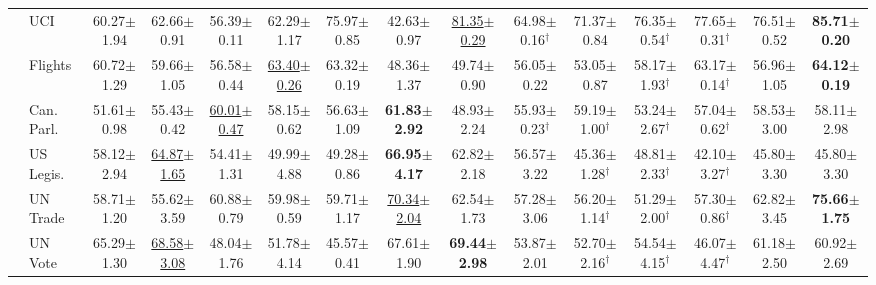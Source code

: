 \begin{table}[t]
{\begin{tabular}{llccccccccccccc}
 & UCI & 60.27{\scriptsize$\pm$1.94} & 62.66{\scriptsize$\pm$0.91} & 56.39{\scriptsize$\pm$0.11} & 62.29{\scriptsize$\pm$1.17} & 75.97{\scriptsize$\pm$0.85} & 42.63{\scriptsize$\pm$0.97} & \underline{81.35{\scriptsize$\pm$0.29}} & 64.98{\scriptsize$\pm$0.16}$^\dagger$ & 71.37{\scriptsize$\pm$0.84} & 76.35{\scriptsize$\pm$0.54}$^\dagger$ & 77.65{\scriptsize$\pm$0.31}$^\dagger$ & 76.51{\scriptsize$\pm$0.52} & \textbf{85.71{\scriptsize$\pm$0.20}} \\
 & Flights & 60.72{\scriptsize$\pm$1.29} & 59.66{\scriptsize$\pm$1.05} & 56.58{\scriptsize$\pm$0.44} & \underline{63.40{\scriptsize$\pm$0.26}} & 63.32{\scriptsize$\pm$0.19} & 48.36{\scriptsize$\pm$1.37} & 49.74{\scriptsize$\pm$0.90} & 56.05{\scriptsize$\pm$0.22} & 53.05{\scriptsize$\pm$0.87} & 58.17{\scriptsize$\pm$1.93}$^\dagger$ & 63.17{\scriptsize$\pm$0.14}$^\dagger$ & 56.96{\scriptsize$\pm$1.05} & \textbf{64.12{\scriptsize$\pm$0.19}} \\
 & Can. Parl. & 51.61{\scriptsize$\pm$0.98} & 55.43{\scriptsize$\pm$0.42} & \underline{60.01{\scriptsize$\pm$0.47}} & 58.15{\scriptsize$\pm$0.62} & 56.63{\scriptsize$\pm$1.09} & \textbf{61.83{\scriptsize$\pm$2.92}} & 48.93{\scriptsize$\pm$2.24} & 55.93{\scriptsize$\pm$0.23}$^\dagger$ & 59.19{\scriptsize$\pm$1.00}$^\dagger$ & 53.24{\scriptsize$\pm$2.67}$^\dagger$ & 57.04{\scriptsize$\pm$0.62}$^\dagger$ & 58.53{\scriptsize$\pm$3.00} & 58.11{\scriptsize$\pm$2.98} \\
 & US Legis. & 58.12{\scriptsize$\pm$2.94} & \underline{64.87{\scriptsize$\pm$1.65}} & 54.41{\scriptsize$\pm$1.31} & 49.99{\scriptsize$\pm$4.88} & 49.28{\scriptsize$\pm$0.86} & \textbf{66.95{\scriptsize$\pm$4.17}} & 62.82{\scriptsize$\pm$2.18} & 56.57{\scriptsize$\pm$3.22} & 45.36{\scriptsize$\pm$1.28}$^\dagger$ & 48.81{\scriptsize$\pm$2.33}$^\dagger$ & 42.10{\scriptsize$\pm$3.27}$^\dagger$ & 45.80{\scriptsize$\pm$3.30} & 45.80{\scriptsize$\pm$3.30} \\
 & UN Trade & 58.71{\scriptsize$\pm$1.20} & 55.62{\scriptsize$\pm$3.59} & 60.88{\scriptsize$\pm$0.79} & 59.98{\scriptsize$\pm$0.59} & 59.71{\scriptsize$\pm$1.17} & \underline{70.34{\scriptsize$\pm$2.04}} & 62.54{\scriptsize$\pm$1.73} & 57.28{\scriptsize$\pm$3.06} & 56.20{\scriptsize$\pm$1.14}$^\dagger$ & 51.29{\scriptsize$\pm$2.00}$^\dagger$ & 57.30{\scriptsize$\pm$0.86}$^\dagger$ & 62.82{\scriptsize$\pm$3.45} & \textbf{75.66{\scriptsize$\pm$1.75}} \\
 & UN Vote & 65.29{\scriptsize$\pm$1.30} & \underline{68.58{\scriptsize$\pm$3.08}} & 48.04{\scriptsize$\pm$1.76} & 51.78{\scriptsize$\pm$4.14} & 45.57{\scriptsize$\pm$0.41} & 67.61{\scriptsize$\pm$1.90} & \textbf{69.44{\scriptsize$\pm$2.98}} & 53.87{\scriptsize$\pm$2.01} & 52.70{\scriptsize$\pm$2.16}$^\dagger$ & 54.54{\scriptsize$\pm$4.15}$^\dagger$ & 46.07{\scriptsize$\pm$4.47}$^\dagger$ & 61.18{\scriptsize$\pm$2.50} & 60.92{\scriptsize$\pm$2.69} \\

\end{tabular}}
\end{table}
